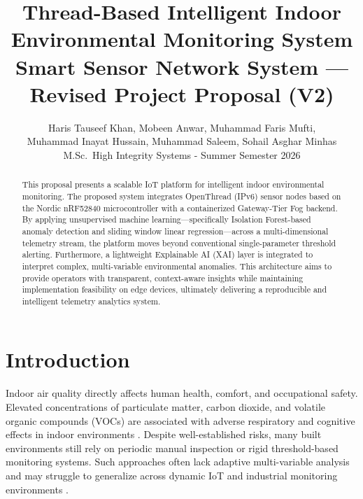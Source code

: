 \documentclass[10pt,a4paper]{article}
\begin{document}
\title{\vspace{-2em}Thread-Based Intelligent Indoor Environmental Monitoring System\\
\large Smart Sensor Network System --- Revised Project Proposal (V2)\vspace{-0.5em}}

\author{%
Haris Tauseef Khan, Mobeen Anwar, Muhammad Faris Mufti,\\
Muhammad Inayat Hussain, Muhammad Saleem, Sohail Asghar Minhas
\vspace{0.5em}
  \\
  M.Sc.\ High Integrity Systems - Summer Semester 2026
}
\date{\vspace{-2em}}

\maketitle

\begin{abstract}
\normalsize
\noindent This proposal presents a scalable IoT platform for intelligent indoor environmental
monitoring. The proposed system integrates OpenThread (IPv6) sensor nodes based on the
Nordic nRF52840 microcontroller with a containerized Gateway-Tier Fog backend. By
applying unsupervised machine learning---specifically Isolation Forest-based anomaly
detection and sliding window linear regression---across a multi-dimensional telemetry
stream, the platform moves beyond conventional single-parameter threshold alerting.
Furthermore, a lightweight Explainable AI (XAI) layer is integrated to interpret
complex, multi-variable environmental anomalies. This architecture aims to provide
operators with transparent, context-aware insights while maintaining implementation
feasibility on edge devices, ultimately delivering a reproducible and intelligent
telemetry analytics system.
\end{abstract}

\section{Introduction}

Indoor air quality directly affects human health, comfort, and occupational safety.
Elevated concentrations of particulate matter, carbon dioxide, and volatile organic
compounds (VOCs) are associated with adverse respiratory and cognitive effects in
indoor environments \cite{who2021}. Despite well-established risks, many built
environments still rely on periodic manual inspection or rigid threshold-based
monitoring systems. Such approaches often lack adaptive multi-variable analysis and
may struggle to generalize across dynamic IoT and industrial monitoring environments
\cite{ortega2025,wu2022}.
\end{document}
